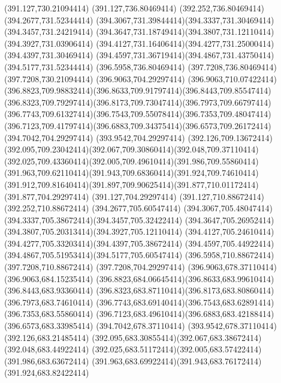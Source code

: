 {{	\lineto(391.127,730.21094414)
	\lineto(391.127,736.80469414)
	\lineto(392.252,736.80469414)
	\lineto(394.2677,731.52344414)
	\curveto(394.3067,731.39844414)(394.3337,731.30469414)(394.3457,731.24219414)
	\curveto(394.3647,731.18749414)(394.3807,731.12110414)(394.3927,731.03906414)
	\curveto(394.4127,731.16406414)(394.4277,731.25000414)(394.4397,731.30469414)
	\curveto(394.4597,731.36719414)(394.4867,731.43750414)(394.5177,731.52344414)
	\lineto(396.5958,736.80469414)
	\lineto(397.7208,736.80469414)
	\lineto(397.7208,730.21094414)
	\closepath
	\moveto(396.9063,704.29297414)
	\lineto(396.9063,710.07422414)
	\curveto(396.8823,709.98832414)(396.8633,709.91797414)(396.8443,709.85547414)
	\curveto(396.8323,709.79297414)(396.8173,709.73047414)(396.7973,709.66797414)
	\curveto(396.7743,709.61327414)(396.7543,709.55078414)(396.7353,709.48047414)
	\curveto(396.7123,709.41797414)(396.6883,709.34375414)(396.6573,709.26172414)
	\lineto(394.7042,704.29297414)
	\lineto(393.9542,704.29297414)
	\lineto(392.126,709.13672414)
	\curveto(392.095,709.23042414)(392.067,709.30860414)(392.048,709.37110414)
	\curveto(392.025,709.43360414)(392.005,709.49610414)(391.986,709.55860414)
	\curveto(391.963,709.62110414)(391.943,709.68360414)(391.924,709.74610414)
	\curveto(391.912,709.81640414)(391.897,709.90625414)(391.877,710.01172414)
	\lineto(391.877,704.29297414)
	\lineto(391.127,704.29297414)
	\lineto(391.127,710.88672414)
	\lineto(392.252,710.88672414)
	\lineto(394.2677,705.60547414)
	\curveto(394.3067,705.48047414)(394.3337,705.38672414)(394.3457,705.32422414)
	\curveto(394.3647,705.26952414)(394.3807,705.20313414)(394.3927,705.12110414)
	\curveto(394.4127,705.24610414)(394.4277,705.33203414)(394.4397,705.38672414)
	\curveto(394.4597,705.44922414)(394.4867,705.51953414)(394.5177,705.60547414)
	\lineto(396.5958,710.88672414)
	\lineto(397.7208,710.88672414)
	\lineto(397.7208,704.29297414)
	\closepath
	\moveto(396.9063,678.37110414)
	\lineto(396.9063,684.15235414)
	\curveto(396.8823,684.06645414)(396.8633,683.99610414)(396.8443,683.93360414)
	\curveto(396.8323,683.87110414)(396.8173,683.80860414)(396.7973,683.74610414)
	\curveto(396.7743,683.69140414)(396.7543,683.62891414)(396.7353,683.55860414)
	\curveto(396.7123,683.49610414)(396.6883,683.42188414)(396.6573,683.33985414)
	\lineto(394.7042,678.37110414)
	\lineto(393.9542,678.37110414)
	\lineto(392.126,683.21485414)
	\curveto(392.095,683.30855414)(392.067,683.38672414)(392.048,683.44922414)
	\curveto(392.025,683.51172414)(392.005,683.57422414)(391.986,683.63672414)
	\curveto(391.963,683.69922414)(391.943,683.76172414)(391.924,683.82422414)
}}
